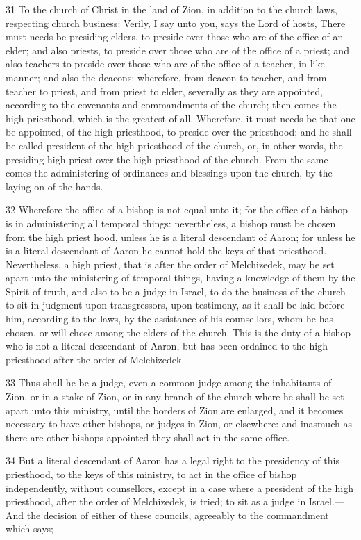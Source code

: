 				31 To the church of Christ in the land of Zion, in addition to the church laws, respecting church business: Verily, I say unto you, says the Lord of hosts, There must needs be presiding elders, to preside over those who are of the office of an elder; and also priests, to preside over those who are of the office of a priest; and also teachers to preside over those who are of the office of a teacher, in like manner; and also the deacons: wherefore, from deacon to teacher, and from teacher to priest, and from priest to elder, severally as they are appointed, according to the covenants and commandments of the church; then comes the high priesthood, which is the greatest of all. Wherefore, it must needs be that one be appointed, of the high priesthood, to preside over the priesthood; and he shall be called president of the high priesthood of the church, or, in other words, the presiding high priest over the high priesthood of the church. From the same comes the administering of ordinances and blessings upon the church, by the laying on of the hands.

				32 Wherefore the office of a bishop is not equal unto it; for the office of a bishop is in administering all temporal things: nevertheless, a bishop must be chosen from the high priest hood, unless he is a literal descendant of Aaron; for unless he is a literal descendant of Aaron he cannot hold the keys of that priesthood. Nevertheless, a high priest, that is after the order of Melchizedek, may be set apart unto the ministering of temporal things, having a knowledge of them by the Spirit of truth, and also to be a judge in Israel, to do the business of the church to sit in judgment upon transgressors, upon testimony, as it shall be laid before him, according to the laws, by the assistance of his counsellors, whom he has chosen, or will chose among the elders of the church. This is the duty of a bishop who is not a literal descendant of Aaron, but has been ordained to the high priesthood after the order of Melchizedek.

				33 Thus shall he be a judge, even a common judge among the inhabitants of Zion, or in a stake of Zion, or in any branch of the church where he shall be set apart unto this ministry, until the borders of Zion are enlarged, and it becomes necessary to have other bishops, or judges in Zion, or elsewhere: and inasmuch as there are other bishops appointed they shall act in the same office.

				34 But a literal descendant of Aaron has a legal right to the presidency of this priesthood, to the keys of this ministry, to act in the office of bishop independently, without counsellors, except in a case where a president of the high priesthood, after the order of Melchizedek, is tried; to sit as a judge in Israel.---And the decision of either of these councils, agreeably to the commandment which says;

